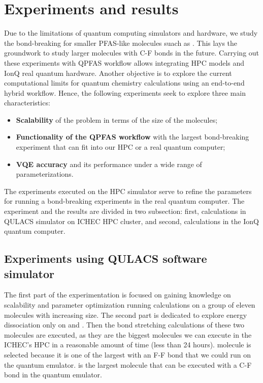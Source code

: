 \documentclass[journal,onecolumn]{IEEEtran}
\begin{document}
\section{Experiments and results}
\label{sec:experiments_and_results}

Due to the limitations of quantum computing simulators and hardware,  we study the bond-breaking for smaller PFAS-like molecules suach as .
This lays the groundwork to study larger molecules with C-F bonds in the future. 
Carrying out these experiments with QPFAS workflow allows integrating HPC models and IonQ real quantum hardware. 
Another objective is to explore the current computational limits for quantum chemistry calculations using an end-to-end hybrid workflow.
%
Hence, the following experiments seek to explore three main characteristics: 
\begin{itemize}
    \item \textbf{Scalability} of the problem in terms of the size of the molecules;
    \item \textbf{Functionality of the QPFAS workflow} with the largest bond-breaking experiment that can fit into our HPC or a real quantum computer;
    \item \textbf{VQE accuracy} and its performance under a wide range of parameterizations. 
\end{itemize}
%
The experiments executed on the HPC simulator serve to refine the parameters for running a bond-breaking experiments in the real quantum computer.
%
The experiment and the results are divided in two subsection: first, calculations in QULACS simulator on ICHEC HPC cluster, and second, calculations in the IonQ quantum computer.


\subsection{Experiments using QULACS software simulator}
\label{sec:experiments_using_quantum_computing_software_emulation}
The first part of the experimentation is focused on gaining knowledge on scalability and parameter optimization running calculations on a group of eleven molecules with increasing size. The second part is dedicated to explore energy dissociation only on  and . 
Then the bond stretching calculations of these two molecules are executed, as they are the biggest molecules we can execute in the ICHEC's HPC in a reasonable amount of time (less than 24 hours).  molecule is selected because it is one of the largest with an F-F bond that we could run on the quantum emulator.
 is the largest molecule that can be executed with a C-F bond in the quantum emulator. 
\end{document}
